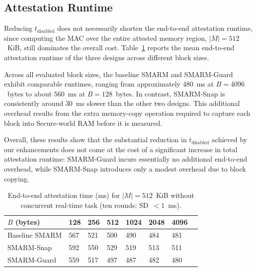 \documentclass[conference]{IEEEtran}
\newcommand{\tdis}{$t_{\mathrm{disabled}}$\xspace}
\newcommand{\smarmcopy}{SMARM-Snap\xspace}
\newcommand{\smarmlock}{SMARM-Guard\xspace}
\begin{document}
\subsection{Attestation Runtime}

Reducing \tdis does not necessarily shorten the end-to-end attestation runtime, since computing the MAC over the entire attested memory region, $|M|{=}512$~KiB, still dominates the overall cost. Table~\ref{tab:attest_runtime} reports the mean end-to-end attestation runtime of the three designs across different block sizes.

Across all evaluated block sizes, the baseline SMARM and \smarmlock exhibit comparable runtimes, ranging from approximately $480$~ms at $B{=}4096$~bytes to about $560$~ms at $B{=}128$~bytes. In contrast, \smarmcopy is consistently around $30$~ms slower than the other two designs. This additional overhead results from the extra memory-copy operation required to capture each block into Secure-world RAM before it is measured.

Overall, these results show that the substantial reduction in \tdis achieved by our enhancements does not come at the cost of a significant increase in total attestation runtime: \smarmlock incurs essentially no additional end-to-end overhead, while \smarmcopy introduces only a modest overhead due to block copying.



\begin{table}[t]
  \centering
  \caption{End-to-end attestation time (ms) for $|M|=512$~KiB without concurrent real-time task (ten rounds; SD~$<1$~ms).}
  \label{tab:attest_runtime}
  \footnotesize
  \setlength{\tabcolsep}{3.5pt}
  \begin{tabularx}{\columnwidth}{@{}lXXXXXXX@{}}
    \toprule
    \textbf{$B$ (bytes)} & 128 & 256 & 512 & 1024 & 2048 & 4096 \\
    \midrule
    Baseline SMARM & 567 & 521 & 500 & 490 & 484 & 481 \\
    \smarmcopy & 592 & 550 & 529 & 519 & 513 & 511 \\
    \smarmlock & 559 & 517 & 497 & 487 & 482 & 480 \\
    \bottomrule
  \end{tabularx}
\end{table}
\end{document}
